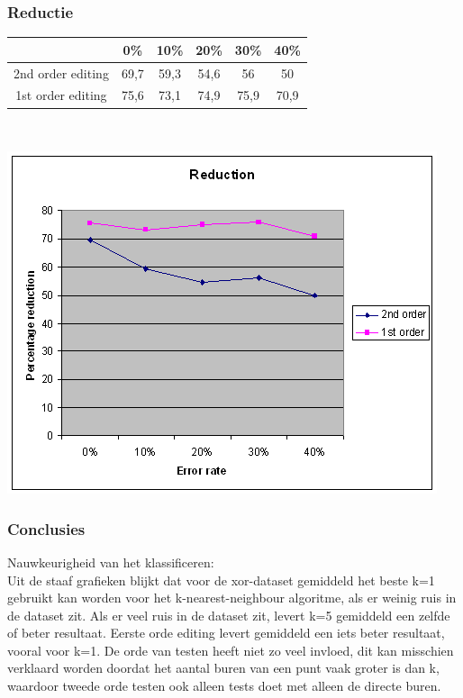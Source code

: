 \documentclass{article}
\begin{document}
\subsubsection{Reductie}
\begin{tabular}{|c|c|c|c|c|c|}  \hline
&	0\% &	10\% & 	20\%	 & 30\%	 & 40\% \\ \hline
2nd order editing &	69,7 &	59,3 &	54,6 & 	56 &	50 \\
1st order editing &	75,6 &	73,1 &	74,9 &	75,9 &	70,9 \\ \hline
\end{tabular} \\
\begin{center} \includegraphics[scale=0.7]{xor_reduction} \end{center}

\subsubsection{Conclusies}
Nauwkeurigheid van het klassificeren: \\
Uit de staaf grafieken blijkt dat voor de xor-dataset gemiddeld het beste k=1 gebruikt kan worden voor het k-nearest-neighbour algoritme, als er weinig ruis in de dataset zit.  Als er veel ruis in de dataset zit, levert k=5 gemiddeld een zelfde of beter resultaat.
Eerste orde editing levert gemiddeld een iets beter resultaat, vooral voor k=1. De orde van testen heeft niet zo veel invloed, dit kan misschien verklaard worden doordat het aantal buren van een punt vaak groter is dan k, waardoor tweede orde testen ook alleen tests doet met alleen de directe buren.\\
\end{document}
